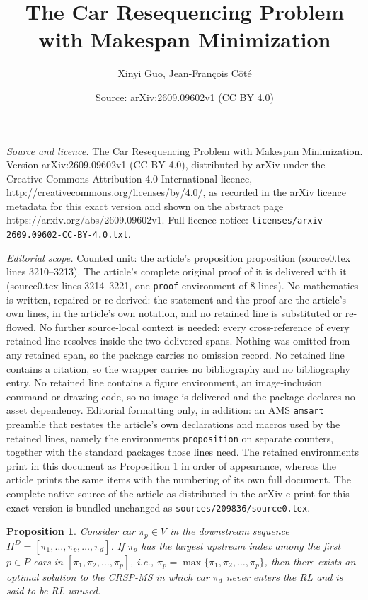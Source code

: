 \documentclass[10pt,a4paper]{amsart}
\title{The Car Resequencing Problem with Makespan Minimization}
\author{Xinyi Guo, Jean-Fran\c{c}ois C\^ot\'e}
\date{Source: arXiv:2609.09602v1 (CC BY 4.0)}
\newtheorem{proposition}{Proposition}
\begin{document}
\maketitle

\noindent\emph{Source and licence.} The Car Resequencing Problem with Makespan Minimization. Version arXiv:2609.09602v1 (CC BY 4.0), distributed by arXiv under the Creative Commons Attribution 4.0 International licence, http://creativecommons.org/licenses/by/4.0/, as recorded in the arXiv licence metadata for this exact version and shown on the abstract page https://arxiv.org/abs/2609.09602v1. Full licence notice: \texttt{licenses/arxiv-2609.09602-CC-BY-4.0.txt}.\par\smallskip

\noindent\textit{Editorial scope.} Counted unit: the article's proposition proposition (source0.tex lines 3210--3213). The article's complete original proof of it is delivered with it (source0.tex lines 3214--3221, one \texttt{proof} environment of 8 lines). No mathematics is written, repaired or re-derived: the statement and the proof are the article's own lines, in the article's own notation, and no retained line is substituted or re-flowed.  No further source-local context is needed: every cross-reference of every retained line resolves inside the two delivered spans.  Nothing was omitted from any retained span, so the package carries no omission record.  No retained line contains a citation, so the wrapper carries no bibliography and no bibliography entry.  No retained line contains a figure environment, an image-inclusion command or drawing code, so no image is delivered and the package declares no asset dependency.  Editorial formatting only, in addition: an AMS \texttt{amsart} preamble that restates the article's own declarations and macros used by the retained lines, namely the environments \texttt{proposition} on separate counters, together with the standard packages those lines need.  The retained environments print in this document as Proposition 1 in order of appearance, whereas the article prints the same items with the numbering of its own full document.  The complete native source of the article as distributed in the arXiv e-print for this exact version is bundled unchanged as \texttt{sources/209836/source0.tex}.
\begin{proposition}
Consider car $\pi_{p}\in V$ in the downstream sequence $\Pi^{D}=[\pi_1,\dots,\pi_p,\dots,\pi_{d}]$. If $\pi_p$ has the largest upstream index among the first $p\in P$ cars in $[\pi_1,\pi_2,\dots,\pi_p]$, i.e., $\pi_p=\max\{\pi_1,\pi_2,\dots,\pi_p\}$, then there exists an optimal solution to the CRSP-MS in which car $\pi_d$ never enters the RL and is said to be RL-unused.
\end{proposition}
\end{document}
